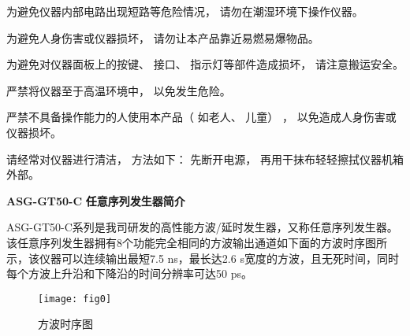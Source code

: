\vspace{0.6cm}

为避免仪器内部电路出现短路等危险情况， 请勿在潮湿环境下操作仪器。


\vspace{0.6cm}

为避免人身伤害或仪器损坏， 请勿让本产品靠近易燃易爆物品。

\vspace{0.6cm}

为避免对仪器面板上的按键、 接口、 指示灯等部件造成损坏， 请注意搬运安全。

\newpage

严禁将仪器至于高温环境中， 以免发生危险。

\vspace{0.5cm}

严禁不具备操作能力的人使用本产品（ 如老人、 儿童） ， 以免造成人身伤害或仪器损坏。

\vspace{0.5cm}

请经常对仪器进行清洁， 方法如下： 先断开电源， 再用干抹布轻轻擦拭仪器机箱外部。

\newpage
\noindent\huge \textbf{ASG-GT50-C} \xiaoer\textbf{任意序列发生器简介}
\vspace{0.6cm}

 \normalsize ASG-GT50-C\song 系列是我司研发的高性能方波/延时发生器，又称任意序列发生器。该任意序列发生器拥有8个功能完全相同的方波输出通道如下面的方波时序图所示，该仪器可以连续输出最短7.5 ns，最长达2.6 s宽度的方波，且无死时间，同时每个方波上升沿和下降沿的时间分辨率可达50 ps。
\begin{figure}[ht]
\centering
\texttt{[image: fig0]}
\caption{方波时序图}\label{fig:fig1}
\end{figure}
\vspace{0.7cm}

